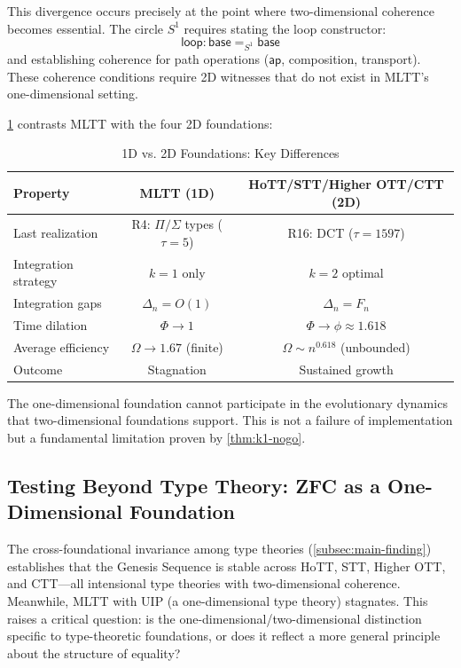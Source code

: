 \documentclass[11pt]{article}
\theoremstyle{definition}
\theoremstyle{remark}
\begin{document}
This divergence occurs precisely at the point where two-dimensional coherence becomes essential. The circle $S^1$ requires stating the loop constructor:
\[
\mathsf{loop} : \mathsf{base} =_{S^1} \mathsf{base}
\]
and establishing coherence for path operations ($\mathsf{ap}$, composition, transport). These coherence conditions require 2D witnesses that do not exist in MLTT's one-dimensional setting.

\cref{tab:mltt-comparison} contrasts MLTT with the four 2D foundations:

\begin{table}[htbp]
\centering
\caption{1D vs. 2D Foundations: Key Differences}
\label{tab:mltt-comparison}
\begin{tabular}{@{}lcc@{}}
\hline
\textbf{Property} & \textbf{MLTT (1D)} & \textbf{HoTT/STT/Higher OTT/CTT (2D)} \\
\hline
Last realization & R4: $\Pi/\Sigma$ types ($\tau=5$) & R16: DCT ($\tau=1597$) \\
Integration strategy & $k=1$ only & $k=2$ optimal \\
Integration gaps & $\Delta_n = O(1)$ & $\Delta_n = F_n$ \\
Time dilation & $\Phi \to 1$ & $\Phi \to \phi \approx 1.618$ \\
Average efficiency & $\Omega \to 1.67$ (finite) & $\Omega \sim n^{0.618}$ (unbounded) \\
Outcome & Stagnation & Sustained growth \\
\hline
\end{tabular}
\end{table}

The one-dimensional foundation cannot participate in the evolutionary dynamics that two-dimensional foundations support. This is not a failure of implementation but a fundamental limitation proven by \cref{thm:k1-nogo}.

\subsection{Testing Beyond Type Theory: ZFC as a One-Dimensional Foundation}
\label{subsec:zfc-test}

The cross-foundational invariance among type theories (\cref{subsec:main-finding}) establishes that the Genesis Sequence is stable across HoTT, STT, Higher OTT, and CTT---all intensional type theories with two-dimensional coherence. Meanwhile, MLTT with UIP (a one-dimensional type theory) stagnates. This raises a critical question: is the one-dimensional/two-dimensional distinction specific to type-theoretic foundations, or does it reflect a more general principle about the structure of equality?
\end{document}

